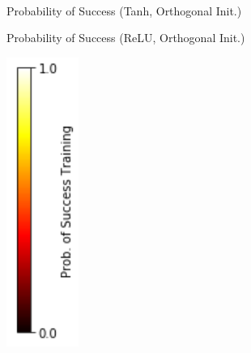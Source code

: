 \begin{figure}
\begin{subfigure}{8mm}
\end{subfigure}%
\\
\begin{subfigure}{\myWidth}
  \centering
  \caption{Probability of Success (Tanh, Orthogonal Init.)}
  \label{fig:mnist_sim_s3}
\end{subfigure}\myspace
\begin{subfigure}{\myWidth}
  \centering
  \caption{Probability of Success (ReLU, Orthogonal Init.)}
  \label{fig:mnist_sim_s4}
\end{subfigure}\myspace
\begin{subfigure}{8mm}
  \includegraphics[width=\linewidth]{s_colorbar}
\end{subfigure}%
  
\end{figure}
